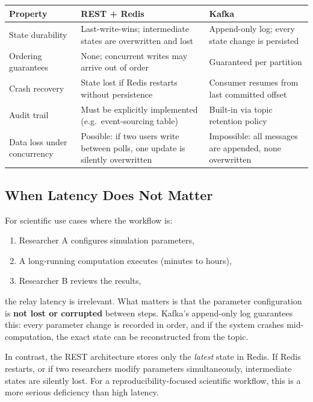 \documentclass[11pt,a4paper]{article}
\begin{document}
\begin{tabularx}{\textwidth}{@{}lXX@{}}
\toprule
\textbf{Property} & \textbf{REST + Redis} & \textbf{Kafka} \\
\midrule
State durability
  & Last-write-wins; intermediate states are overwritten and lost
  & Append-only log; every state change is persisted \\
Ordering guarantees
  & None; concurrent writes may arrive out of order
  & Guaranteed per partition \\
Crash recovery
  & State lost if Redis restarts without persistence
  & Consumer resumes from last committed offset \\
Audit trail
  & Must be explicitly implemented (e.g.\ event-sourcing table)
  & Built-in via topic retention policy \\
Data loss under concurrency
  & Possible: if two users write between polls, one update is silently
    overwritten
  & Impossible: all messages are appended, none overwritten \\
\bottomrule
\end{tabularx}

\subsection{When Latency Does Not Matter}

For scientific use cases where the workflow is:

\begin{enumerate}
  \item Researcher A configures simulation parameters,
  \item A long-running computation executes (minutes to hours),
  \item Researcher B reviews the results,
\end{enumerate}

\noindent the relay latency is irrelevant. What matters is that the
parameter configuration is \textbf{not lost or corrupted} between steps.
Kafka's append-only log guarantees this: every parameter change is
recorded in order, and if the system crashes mid-computation, the exact
state can be reconstructed from the topic.

In contrast, the REST architecture stores only the \textit{latest} state
in Redis. If Redis restarts, or if two researchers modify parameters
simultaneously, intermediate states are silently lost. For a
reproducibility-focused scientific workflow, this is a more serious
deficiency than high latency.
\end{document}
